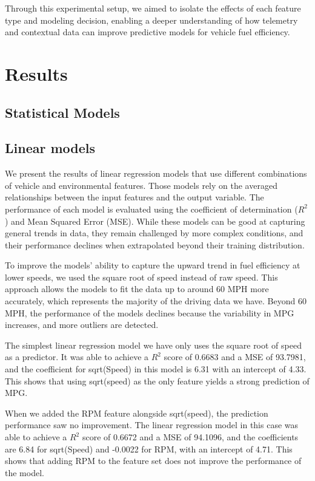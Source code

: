 \documentclass[letterpaper]{article}
\begin{document}
Through this experimental setup, we aimed to isolate the effects of each 
feature type and modeling decision, enabling a deeper understanding of how 
telemetry and contextual data can improve predictive models for vehicle 
fuel efficiency.

\section*{Results}

\subsection*{Statistical Models}

\subsection{Linear models}

We present the results of linear regression models that use different 
combinations of vehicle and environmental features. Those models rely on 
the averaged relationships between the input features and the output 
variable. The performance of each model is evaluated using the coefficient 
of determination ($R^2$) and Mean Squared Error (MSE). While these models 
can be good at capturing general trends in data, they remain challenged by 
more complex conditions, and their performance declines when extrapolated 
beyond their training distribution.

To improve the models' ability to capture the upward trend in fuel 
efficiency at lower speeds, we used the square root of speed instead of 
raw speed. This approach allows the models to fit the data up to around 
60 MPH more accurately, which represents the majority of the driving data 
we have. Beyond 60 MPH, the performance of the models declines because the 
variability in MPG increases, and more outliers are detected.

The simplest linear regression model we have only uses the square root of 
speed as a predictor. It was able to achieve a $R^2$ score of 0.6683 and a 
MSE of 93.7981, and the coefficient for sqrt(Speed) in this model is 6.31 
with an intercept of 4.33. This shows that using sqrt(speed) as the only 
feature yields a strong prediction of MPG.

When we added the RPM feature alongside sqrt(speed), the prediction 
performance saw no improvement. The linear regression model in this case 
was able to achieve a $R^2$ score of 0.6672 and a MSE of 94.1096, and the 
coefficients are 6.84 for sqrt(Speed) and -0.0022 for RPM, with an 
intercept of 4.71. This shows that adding RPM to the feature set does not 
improve the performance of the model.
\end{document}
